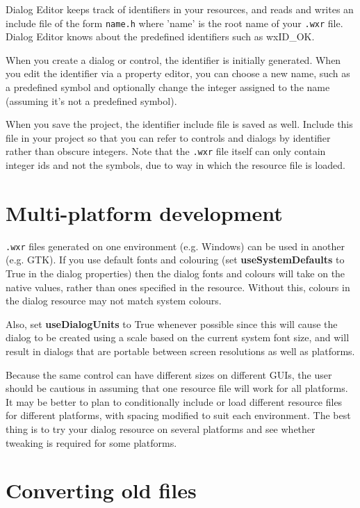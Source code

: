 Dialog Editor keeps track of identifiers in your resources, and reads and writes an include file of the
form {\tt name.h} where 'name' is the root name of your {\tt .wxr} file. Dialog Editor
knows about the predefined identifiers such as wxID\_OK.

When you create a dialog or control, the identifier is initially generated. When you
edit the identifier via a property editor, you can choose a new name, such as a predefined
symbol and optionally change the integer assigned to the name (assuming it's not a
predefined symbol).

When you save the project, the identifier include file is saved as well. Include this file
in your project so that you can refer to controls and dialogs by identifier rather than
obscure integers. Note that the {\tt .wxr} file itself can only contain integer ids and not the symbols,
due to way in which the resource file is loaded.

\section{Multi-platform development}

{\tt .wxr} files generated on one environment (e.g. Windows) can be used in another (e.g. GTK).
If you use default fonts and colouring (set {\bf useSystemDefaults} to True in the dialog properties)
then the dialog fonts and colours will take on the native values, rather than ones specified in the
resource. Without this, colours in the dialog resource may not match system colours.

Also, set {\bf useDialogUnits} to True whenever possible since this will cause the dialog
to be created using a scale based on the current system font size, and will result in dialogs that are
portable between screen resolutions as well as platforms.

Because the same control can have different sizes on different GUIs,
the user should be cautious in assuming that one resource file will work for all
platforms. It may be better to plan to conditionally include or load different
resource files for different platforms, with spacing modified to suit each
environment. The best thing is to try your dialog resource on several platforms
and see whether tweaking is required for some platforms.

\section{Converting old files}\label{convertingoldfiles}


